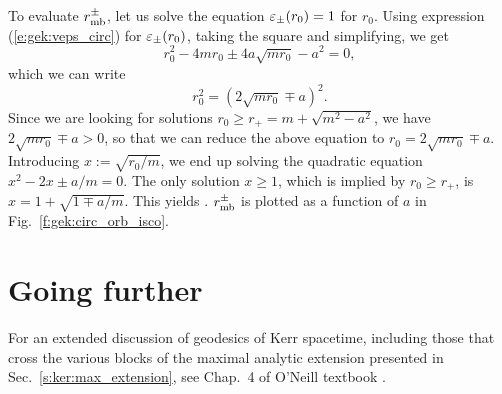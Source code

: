 To evaluate $r_{\rm mb}^\pm$, let us solve the equation $\varepsilon_\pm(r_0) = 1$ for $r_0$.
Using expression (\ref{e:gek:veps_circ}) for $\varepsilon_\pm(r_0)$, taking the square
and simplifying, we get
\[
    r_0^2 - 4 m r_0 \pm 4 a \sqrt{m r_0} - a^2 = 0 ,
\]
which we can write
\[
    r_0^2 = (2\sqrt{mr_0} \mp a)^2  .
\]
Since we are looking for solutions $r_0 \geq r_+ = m + \sqrt{m^2 - a^2}$, we have
$2\sqrt{m r_0} \mp a > 0$, so that we can reduce the above equation to
$r_0 = 2\sqrt{m r_0} \mp a$. Introducing $x := \sqrt{r_0/m}$, we end up solving
the quadratic equation $x^2 - 2 x \pm a/m = 0$.
The only solution $x \geq 1$, which is implied by $r_0 \geq r_+$, is
$x = 1 + \sqrt{1 \mp a/m}$. This yields
\be \label{e:gek:r_mb_circ}
     .
\ee
$r_{\rm mb}^\pm$ is plotted as a function of $a$ in Fig.~\ref{f:gek:circ_orb_isco}.









\section{Going further}

For an extended discussion of geodesics of Kerr spacetime, including those
that cross the various blocks of the maximal analytic extension presented in
Sec.~\ref{s:ker:max_extension}, see Chap.~4 of O'Neill textbook \cite{ONeil95}.

